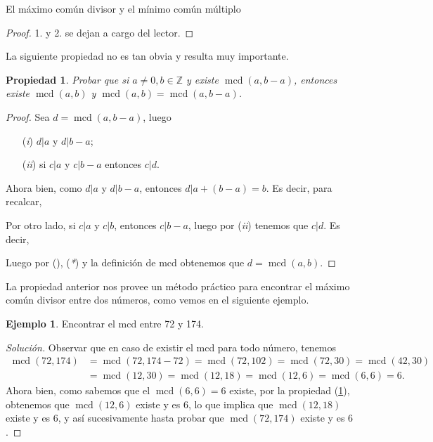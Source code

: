 \documentclass[11pt,spanish,makeidx]{amsbook}
\newtheorem{propiedad}[teorema]{Propiedad}
\theoremstyle{definition}
\newtheorem{ejemplo}{Ejemplo}[section]
\theoremstyle{remark}
\newcommand \mcd{\operatorname{mcd}}
\begin{document}
\begin{section}{El máximo común divisor y el mínimo común múltiplo}
\begin{proof}
1. y 2.  se dejan a cargo del lector. 
\end{proof}

La siguiente propiedad no es tan obvia y resulta muy importante. 
 
\begin{propiedad}\label{propiedad1}
Probar que si $a \not=0, b \in \mathbb Z$ y existe $\mcd(a,b-a)$, entonces existe $\mcd(a,b)$ y $\mcd(a,b) = \mcd(a,b-a)$. 
\end{propiedad}
\begin{proof}
Sea $d =  \mcd(a,b-a)$, luego 
\begin{enumerate}
\item[({\em i})] $ d|a$ y $d|b -a$;
\item[({\em ii})] si $ c|a $ y $c|b -a$ entonces $ c|d$.
\end{enumerate}
Ahora bien, como  $ d|a$ y $d|b -a$, entonces $  d|a +(b -a) = b$. Es decir, para recalcar,
 

\noindent Por otro lado, si  $ c|a $ y $c|b$, entonces  $c|b -a$, luego por ({\em ii}) tenemos que $c|d$. Es decir, 


\noindent Luego por ({\em *}), ({\em **}) y la definición de mcd obtenemos que $d = \mcd(a,b)$.
\end{proof}

La propiedad anterior nos provee un método práctico para encontrar el máximo común divisor entre dos números, como vemos en el siguiente ejemplo.

\begin{ejemplo} Encontrar el mcd entre 72 y 174.
\begin{proof}[Solución] Observar que en caso de existir el mcd para todo número, tenemos
\begin{align*}
\mcd(72, 174) &= \mcd(72,174-72) = \mcd(72,102) = \mcd(72,30) =  \mcd(42, 30) \\&= \mcd(12,30) = \mcd(12,18)= \mcd(12,6)= \mcd(6,6) = 6.  
\end{align*}
Ahora bien, como sabemos que el $\mcd(6,6)=6$ existe, por la propiedad (\ref{propiedad1}), obtenemos que $\mcd(12,6) $ existe y es $6$, lo que implica que 
$\mcd(12,18)$ existe y es $6$, y así sucesivamente hasta probar que $\mcd(72, 174)$ existe y es $6$.
\end{proof}
\end{ejemplo} 


\end{section}
\end{document}
